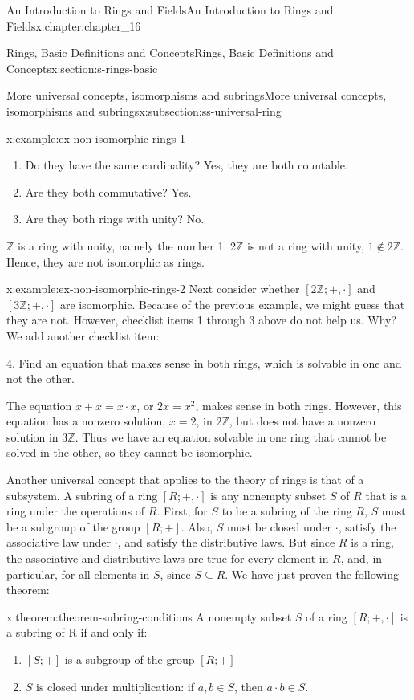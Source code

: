 \documentclass[oneside,10pt,]{book}
\numberwithin{equation}{section}
\begin{document}
\begin{chapterptx}{An Introduction to Rings and Fields}{}{An Introduction to Rings and Fields}{}{}{x:chapter:chapter_16}
\begin{sectionptx}{Rings, Basic Definitions and Concepts}{}{Rings, Basic Definitions and Concepts}{}{}{x:section:s-rings-basic}
\begin{subsectionptx}{More universal concepts, isomorphisms and subrings}{}{More universal concepts, isomorphisms and subrings}{}{}{x:subsection:ss-universal-ring}
\begin{example}{}{x:example:ex-non-isomorphic-rings-1}
\begin{enumerate}[label=(\arabic*)]
\item{}Do they have the same cardinality? Yes, they are both countable.%
\item{}Are they both commutative? Yes.%
\item{}Are they both rings with unity? No.%
\end{enumerate}
\(\mathbb{Z}\) is a ring with unity, namely the number 1.   2\(\mathbb{Z}\) is not a ring with unity, \(1\notin 2\mathbb{Z}\).  Hence, they are not isomorphic as rings.%
\end{example}
\begin{example}{}{x:example:ex-non-isomorphic-rings-2}%
Next consider whether \([2\mathbb{Z};+,\cdot]\) and \([3\mathbb{Z}; +, \cdot ]\) are isomorphic. Because of the previous example, we might  guess that they are not.   However, checklist items 1 through 3 above do not help us. Why? We add another checklist item:%
\par
4.  Find an equation that makes sense in both rings, which is solvable in one and not the other.%
\par
The equation \(x + x = x \cdot  x\),  or \(2x=x^2\), makes sense in both rings. However, this equation has a nonzero solution, \(x = 2\), in \(2\mathbb{Z}\), but does not have a nonzero solution in \(3\mathbb{Z}\). Thus we have an equation solvable in one ring that cannot be solved in the other, so they cannot be isomorphic.%
\end{example}
Another universal concept that applies to the theory of rings is that of a subsystem. A subring of a ring \([R; +, \cdot ]\) is any nonempty subset \(S\) of \(R\) that is a ring under the operations of \(R\). First, for \(S\) to be a subring of the ring \(R\), \(S\) must be a subgroup of the group \([R; +]\). Also, \(S\) must be closed under \(\cdot\), satisfy the associative law under \(\cdot\), and satisfy the distributive laws. But since \(R\) is a ring, the associative and distributive laws are true for every element in \(R\), and, in particular, for all elements in \(S\), since \(S\subseteq R\). We have just proven the following theorem:%
\begin{theorem}{}{}{x:theorem:theorem-subring-conditions}%
A nonempty subset \(S\) of a ring \([R; + , \cdot]\) is a subring of R if and only if:%
\begin{enumerate}[label=(\arabic*)]
\item{}\([S; +]\) is a subgroup of the group \([R; +]\)%
\item{}\(S\) is closed under multiplication: if \(a, b \in  S\), then \(a \cdot  b \in  S\).%

\end{enumerate}
\end{theorem}
\end{subsectionptx}
\end{sectionptx}
\end{chapterptx}
\end{document}
